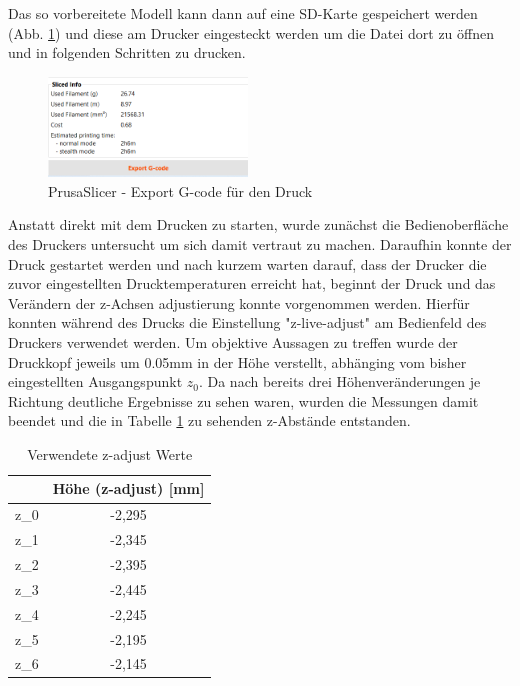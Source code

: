 \documentclass[a4paper,12pt,bibtotocnumbered]{scrartcl}
\numberwithin{equation}{section} %
\begin{document}
Das so vorbereitete Modell kann dann auf eine SD-Karte gespeichert werden (Abb. \ref*{export}) und diese am Drucker eingesteckt werden um die Datei dort zu öffnen und in folgenden Schritten zu drucken.

\begin{figure}[htbp]
\centerline{\includegraphics[width=200px]{./images/export.png}}
\caption{PrusaSlicer - Export G-code für den Druck}
\label{export}
\end{figure}

Anstatt direkt mit dem Drucken zu starten, wurde zunächst die Bedienoberfläche des Druckers untersucht um sich damit vertraut zu machen. Daraufhin konnte der Druck gestartet werden und nach kurzem warten darauf, dass der Drucker die zuvor eingestellten Drucktemperaturen erreicht hat, beginnt der Druck und das Verändern der z-Achsen adjustierung konnte vorgenommen werden. Hierfür konnten während des Drucks die Einstellung "z-live-adjust" am Bedienfeld des Druckers verwendet werden. Um objektive Aussagen zu treffen wurde der Druckkopf jeweils um 0.05mm in der Höhe verstellt, abhänging vom bisher eingestellten Ausgangspunkt $z_0$. Da nach bereits drei Höhenveränderungen je Richtung deutliche Ergebnisse zu sehen waren, wurden die Messungen damit beendet und die in Tabelle \ref*{z_adjust} zu sehenden z-Abstände entstanden.

\bgroup
\def\arraystretch{1.6}%
\begin{table}[]
\caption{Verwendete z-adjust Werte}
\centering
\begin{tabular}{|c|c|}
\hline
	 & Höhe (z-adjust) {[}mm{]} \\ \hline
z\_0 & -2,295                   \\ \hline
z\_1 & -2,345                   \\ \hline
z\_2 & -2,395                   \\ \hline
z\_3 & -2,445                   \\ \hline
z\_4 & -2,245                   \\ \hline
z\_5 & -2,195                   \\ \hline
z\_6 & -2,145                   \\ \hline
\end{tabular}
\label{z_adjust}
\end{table}
\egroup
\end{document}
